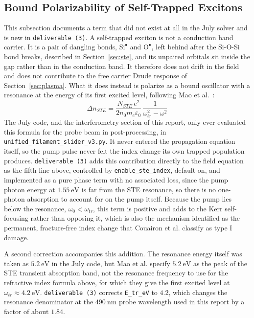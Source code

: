 \subsection{Bound Polarizability of Self-Trapped Excitons}
\label{subsec:ste_polarizability}

This subsection documents a term that did not exist at all in the July solver and is new in \texttt{deliverable~(3)}. A self-trapped exciton is not a conduction band carrier. It is a pair of dangling bonds, $\text{Si}^\bullet$ and $\text{O}^\bullet$, left behind after the Si-O-Si bond breaks, described in Section~\ref{sec:ste}, and its unpaired orbitals sit inside the gap rather than in the conduction band. It therefore does not drift in the field and does not contribute to the free carrier Drude response of Section~\ref{sec:plasma}. What it does instead is polarize as a bound oscillator with a resonance at the energy of its first excited level, following Mao et al.~\cite{mao2004}:
\begin{equation}
\Delta n_{STE} = \frac{N_{STE}\,e^2}{2n_0m_e\varepsilon_0}\,\frac{1}{\omega_{tr}^2-\omega^2}
\end{equation}
The July code, and the interferometry section of this report, only ever evaluated this formula for the probe beam in post-processing, in \texttt{unified\_filament\_slider\_v3.py}. It never entered the propagation equation itself, so the pump pulse never felt the index change its own trapped population produces. \texttt{deliverable~(3)} adds this contribution directly to the field equation as the fifth line above, controlled by \texttt{enable\_ste\_index}, default on, and implemented as a pure phase term with no associated loss, since the pump photon energy at $1.55\ \text{eV}$ is far from the STE resonance, so there is no one-photon absorption to account for on the pump itself. Because the pump lies below the resonance, $\omega_0<\omega_{tr}$, this term is positive and adds to the Kerr self-focusing rather than opposing it, which is also the mechanism identified as the permanent, fracture-free index change that Couairon et al. classify as type I damage.

A second correction accompanies this addition. The resonance energy itself was taken as $5.2\ \text{eV}$ in the July code, but Mao et al. specify $5.2\ \text{eV}$ as the peak of the STE transient absorption band, not the resonance frequency to use for the refractive index formula above, for which they give the first excited level at $\omega_{tr}\approx 4.2\ \text{eV}$. \texttt{deliverable~(3)} corrects \texttt{E\_tr\_eV} to $4.2$, which changes the resonance denominator at the $490\ \text{nm}$ probe wavelength used in this report by a factor of about $1.84$.

